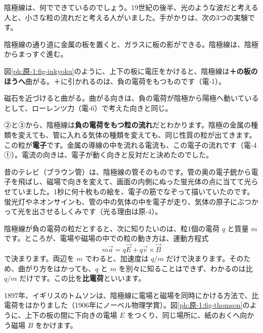 \noindent 陰極線は、何でできているのでしょう。19世紀の後半、光のような波だと考える人と、小さな粒の流れだと考える人がいました。手がかりは、次の3つの実験です。
\begin{enumerate}[label={\bkcircled[bkBlue]{\arabic*}}, leftmargin=2.4\zw, itemsep=1pt, topsep=2pt]
\item 陰極線の通り道に金属の板を置くと、ガラスに板の影ができる。陰極線は、陰極からまっすぐ進む。
\item 図\ref{ph:原-1:fig-inkyoku}のように、上下の板に電圧をかけると、陰極線は\textbf{＋の板のほうへ}曲がる。＋に引かれるのは、負の電荷をもつものです（電-1）。
\item 磁石を近づけると曲がる。曲がる向きは、負の電荷が陰極から陽極へ動いているとして、ローレンツ力（電-6）で考えた向きと同じ。
\end{enumerate}
②と③から、陰極線は\textbf{負の電荷をもつ粒の流れ}だとわかります。陰極の金属の種類を変えても、管に入れる気体の種類を変えても、同じ性質の粒が出てきます。この粒が\textbf{電子}です。金属の導線の中を流れる電流も、この電子の流れです（電-4 ①）。電流の向きは、電子が動く向きと反対だと決めたのでした。

\begin{phmijika}
昔のテレビ（ブラウン管）は、陰極線の管そのものです。管の奥の電子銃から電子を飛ばし、磁場で向きを変えて、画面の内側にぬった蛍光体の点に当てて光らせていました。1秒に何十枚もの絵を、電子の筋でなぞって描いていたのです。蛍光灯やネオンサインも、管の中の気体の中を電子が走り、気体の原子にぶつかって光を出させるしくみです（光る理由は原-4）。
\end{phmijika}

\label{ph:原-1:sec2}
陰極線が負の電荷の粒だとすると、次に知りたいのは、粒1個の電荷 $q$ と質量 $m$ です。ところが、電場や磁場の中での粒の動き方は、運動方程式
\[ m\vec a=q\vec E+q\vec v\times\vec B \]
で決まります。両辺を $m$ でわると、加速度は $q/m$ だけで決まります。そのため、曲がり方をはかっても、$q$ と $m$ を別々に知ることはできず、わかるのは比 $q/m$ だけです。この比を\textbf{比電荷}といいます。

1897年、イギリスのトムソンは、陰極線に電場と磁場を同時にかける方法で、比電荷をはかりました（1906年にノーベル物理学賞）。図\ref{ph:原-1:fig-thomson}のように、上下の板の間に下向きの電場 $E$ をつくり、同じ場所に、紙のおくへ向かう磁場 $B$ をかけます。

